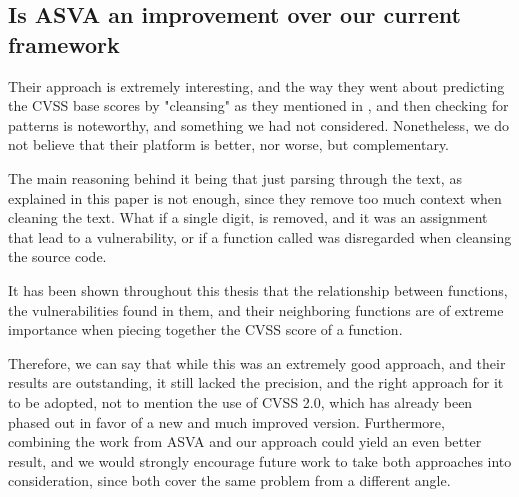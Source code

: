 \subsection{Is ASVA an improvement over our current framework}

Their approach is extremely interesting, and the way they went about predicting the CVSS base scores by "cleansing" as they mentioned in \parencite{novelty}, and then checking for patterns is noteworthy, and something we had not considered. Nonetheless, we do not believe that their platform is better, nor worse, but complementary.

The main reasoning behind it being that just parsing through the text, as explained in this paper is not enough, since they remove too much context when cleaning the text. What if a single digit, is removed, and it was an assignment that lead to a vulnerability, or if a function called was disregarded when cleansing the source code.

It has been shown throughout this thesis that the relationship between functions, the vulnerabilities found in them, and their neighboring functions are of extreme importance when piecing together the CVSS score of a function.

Therefore, we can say that while this was an extremely good approach, and their results are outstanding, it still lacked the precision, and the right approach for it to be adopted, not to mention the use of CVSS 2.0, which has already been phased out in favor of a new and much improved version. Furthermore, combining the work from ASVA and our approach could yield an even better result, and we would strongly encourage future work to take both approaches into consideration, since both cover the same problem from a different angle.


